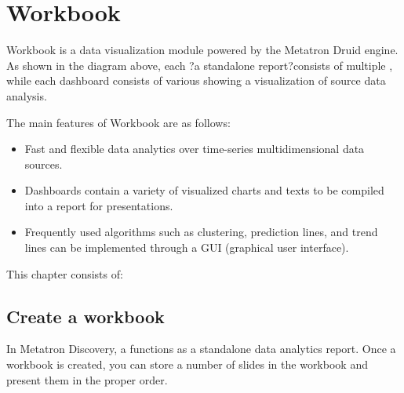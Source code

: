 \documentclass[letterpaper,10pt,english]{sphinxmanual}
\begin{document}
\chapter{Workbook}
\label{\detokenize{discovery/part04/index:id1}}\label{\detokenize{discovery/part04/index::doc}}
\begin{figure}[H]
\centering

\noindent{}
\end{figure}

Workbook is a data visualization module powered by the Metatron Druid engine. As shown in the diagram above, each ?a standalone report?consists of multiple , while each dashboard consists of various  showing a visualization of source data analysis.

The main features of Workbook are as follows:
\begin{itemize}
\item {} 
Fast and flexible data analytics over time-series multidimensional data sources.

\item {} 
Dashboards contain a variety of visualized charts and texts to be compiled into a report for presentations.

\item {} 
Frequently used algorithms such as clustering, prediction lines, and trend lines can be implemented through a GUI (graphical user interface).

\end{itemize}

This chapter consists of:


\section{Create a workbook}
\label{\detokenize{discovery/part04/create_a_workbook:id1}}\label{\detokenize{discovery/part04/create_a_workbook::doc}}
In Metatron Discovery, a  functions as a standalone data analytics report. Once a workbook is created, you can store a number of  slides in the workbook and present them in the proper order.
\end{document}
